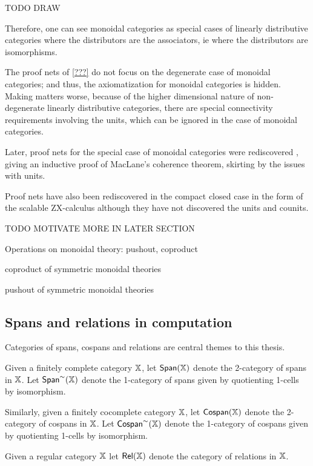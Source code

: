 TODO DRAW

Therefore, one can see monoidal categories as special cases of linearly distributive categories where the distributors are the associators, ie where the distributors are isomorphisms.

The proof nets of \ref{???} do not focus on the degenerate case of monoidal categories; and thus, the axiomatization for monoidal  categories is hidden.  Making matters worse, because of the higher dimensional nature of non-degenerate linearly distributive categories, there are special connectivity requirements involving the units, which can be ignored in the case of monoidal categories.

Later, proof nets for the special case of monoidal categories were rediscovered \cite{????}, giving an inductive proof of MacLane's coherence theorem, skirting by the issues with units.

Proof nets have also been rediscovered in the compact closed case in the form of the scalable ZX-calculus \cite{???} although they have not discovered the units and counits.

TODO MOTIVATE MORE IN LATER SECTION



Operations on monoidal theory:  pushout, coproduct



\begin{lemma}
coproduct of symmetric monoidal theories
\end{lemma}

\begin{lemma}
pushout of symmetric monoidal theories
\end{lemma}


\subsection{Spans and relations in computation}

Categories of spans, cospans and relations are central themes to this thesis.

\begin{definition}
Given a finitely complete category $\mathbb{X}$, let $\mathsf{Span}(\mathbb{X})$ denote the 2-category of spans in $\mathbb{X}$.  Let $\mathsf{Span}^\sim(\mathbb{X})$ denote the 1-category of spans given by quotienting 1-cells by isomorphism.

Similarly, given a finitely cocomplete category $\mathbb{X}$, let ${\sf Cospan}(\mathbb{X})$ denote the 2-category of cospans in $\mathbb{X}$.  Let ${\sf Cospan}^\sim(\mathbb{X})$ denote the 1-category of cospans given by quotienting 1-cells by isomorphism.

Given a regular category $\mathbb{X}$ let $\mathsf{Rel}(\mathbb{X})$ denote the category of relations in $\mathbb{X}$.
\end{definition}

